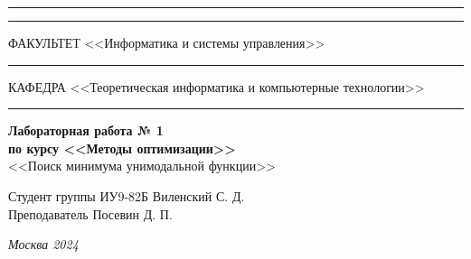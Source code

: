 \documentclass[a4paper, 14pt]{extarticle}
\begin{document}
\begin{titlepage}
\vspace{-25pt}
\hspace{-35pt}\rule{\textwidth}{2.3pt}

\vspace*{-20.3pt}
\hspace{-35pt}\rule{\textwidth}{0.4pt}

\vspace{1.5ex}
\hspace{-35pt} \noindent \small ФАКУЛЬТЕТ\hspace{80pt} <<Информатика и системы управления>>

\vspace*{-16pt}
\hspace{47pt}\rule{0.83\textwidth}{0.4pt}

\vspace{0.5ex}
\hspace{-35pt} \noindent \small КАФЕДРА\hspace{50pt} <<Теоретическая информатика и компьютерные технологии>>

\vspace*{-16pt}
\hspace{30pt}\rule{0.866\textwidth}{0.4pt}
  
\vspace{11em}

\begin{center}
\Large {\bf Лабораторная работа № 1} \\ 
\large {\bf по курсу <<Методы оптимизации>>} \\
\large <<Поиск минимума унимодальной функции>> 
\end{center}\normalsize

\vspace{8em}


\begin{flushright}
  {Студент группы ИУ9-82Б Виленский С. Д. \hspace*{15pt}\\ 
  \vspace{2ex}
  Преподаватель Посевин Д. П.\hspace*{15pt}}
\end{flushright}

\bigskip

\vfill
 

\begin{center}
\textsl{Москва 2024}
\end{center}
\end{titlepage}
\end{document}
